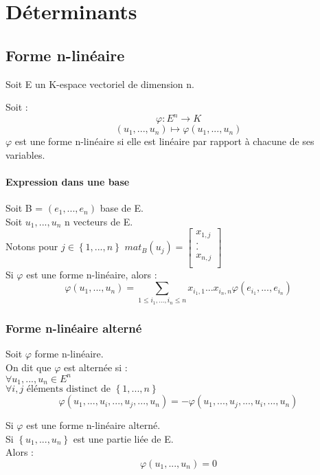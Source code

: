 
\chapter{Déterminants}
\section{Forme n-linéaire}
Soit E un K-espace vectoriel de dimension n.
\begin{de}
Soit :
$$\varphi : E^n \rightarrow K$$
$$(u_1,...,u_n) \mapsto \varphi(u_1,...,u_n)$$
$\varphi$ est une forme n-linéaire si elle est linéaire par rapport à chacune de ses variables.
\end{de}
\subsubsection{Expression dans une base}
\begin{de}
Soit B = $(e_1,...,e_n)$ base de E.\\
Soit $u_1,...,u_n$ n vecteurs de E.\\
Notons pour $j \in \left\lbrace 1,...,n\right\rbrace$ $mat_B(u_j) = 
\begin{bmatrix}
  x_{1,j} \\
  . \\
  . \\
  x_{n,j}  \\
\end{bmatrix}$\\
Si $\varphi$ est une forme n-linéaire, alors : $$\varphi(u_1,...,u_n) = \sum_{1 \leq i_1,...,i_n \leq n} x_{i_1,1}...x_{i_n,n}\varphi(e_{i_1},...,e_{i_n})$$ 
\end{de}
\subsection{Forme n-linéaire alterné}
\begin{de}
Soit $\varphi$ forme n-linéaire.\\ On dit que $\varphi$ est alternée si :\\
$\forall u_1,...,u_n \in E^n$\\
$\forall i,j \mbox{ éléments distinct de }  \left\lbrace 1,...,n \right\rbrace$
$$\varphi(u_1,...,u_i,...,u_j,...,u_n) = -\varphi(u_1,...,u_j,...,u_i,...,u_n)$$
\end{de}
\begin{prop}
Si $\varphi$ est une forme n-linéaire alterné.\\
Si $\left\lbrace u_1,...,u_n \right\rbrace$ est une partie liée de E.\\
Alors : 
$$\varphi(u_1,...,u_n) = 0$$ 
\end{prop}
